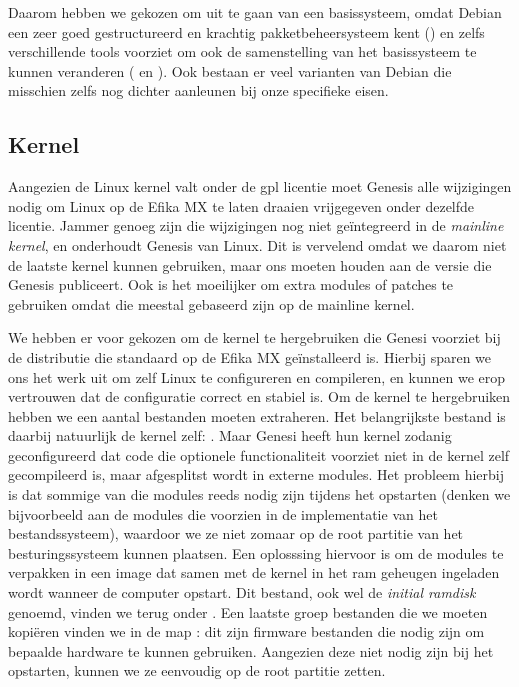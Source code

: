 Daarom hebben we gekozen om uit te gaan van een  basissysteem, omdat Debian een zeer goed gestructureerd en krachtig pakketbeheersysteem kent () en zelfs verschillende tools voorziet om ook de samenstelling van het basissysteem te kunnen veranderen ( en ). Ook bestaan er veel varianten van Debian die misschien zelfs nog dichter aanleunen bij onze specifieke eisen.

\subsection{Kernel}
\label{kiosk:deployment:besturingssysteem:kernel}

Aangezien de Linux kernel valt onder de \ac{gpl} licentie moet Genesis alle wijzigingen nodig om Linux op de Efika MX te laten draaien vrijgegeven onder dezelfde licentie. Jammer genoeg zijn die wijzigingen nog niet geïntegreerd in de \emph{mainline kernel}, en onderhoudt Genesis  van Linux. Dit is vervelend omdat we daarom niet de laatste kernel kunnen gebruiken, maar ons moeten houden aan de versie die Genesis publiceert. Ook is het moeilijker om extra modules of patches te gebruiken omdat die meestal gebaseerd zijn op de mainline kernel.

We hebben er voor gekozen om de kernel te hergebruiken die Genesi voorziet bij de distributie die standaard op de Efika MX geïnstalleerd is. Hierbij sparen we ons het werk uit om zelf Linux te configureren en compileren, en kunnen we erop vertrouwen dat de configuratie correct en stabiel is. Om de kernel te hergebruiken hebben we een aantal bestanden moeten extraheren. Het belangrijkste bestand is daarbij natuurlijk de kernel zelf: . Maar Genesi heeft hun kernel zodanig geconfigureerd dat code die optionele functionaliteit voorziet niet in de kernel zelf gecompileerd is, maar afgesplitst wordt in externe modules. Het probleem hierbij is dat sommige van die modules reeds nodig zijn tijdens het opstarten (denken we bijvoorbeeld aan de modules die voorzien in de implementatie van het bestandssysteem), waardoor we ze niet zomaar op de root partitie van het besturingssysteem kunnen plaatsen. Een oplosssing hiervoor is om de modules te verpakken in een image dat samen met de kernel in het \ac{ram} geheugen ingeladen wordt wanneer de computer opstart. Dit bestand, ook wel de \emph{initial ramdisk} genoemd, vinden we terug onder . Een laatste groep bestanden die we moeten kopiëren vinden we in de map : dit zijn firmware bestanden die nodig zijn om bepaalde hardware te kunnen gebruiken. Aangezien deze niet nodig zijn bij het opstarten, kunnen we ze eenvoudig op de root partitie zetten.

